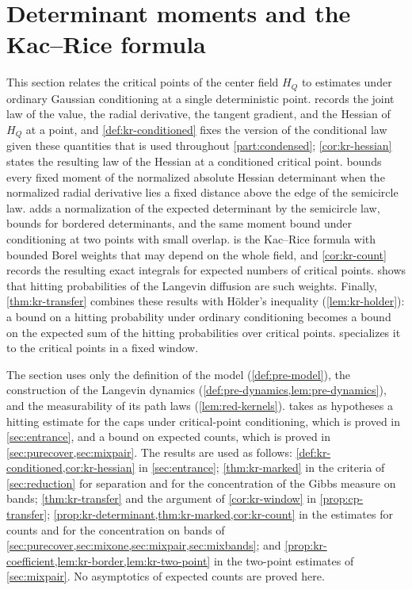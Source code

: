 \chapter{Determinant moments and the Kac--Rice formula}\label{sec:kacrice}

This section relates the critical points of the center field $H_Q$ to estimates under ordinary Gaussian conditioning at a single deterministic point.  records the joint law of the value, the radial derivative, the tangent gradient, and the Hessian of $H_Q$ at a point, and \cref{def:kr-conditioned} fixes the version of the conditional law given these quantities that is used throughout \cref{part:condensed}; \cref{cor:kr-hessian} states the resulting law of the Hessian at a conditioned critical point.  bounds every fixed moment of the normalized absolute Hessian determinant when the normalized radial derivative lies a fixed distance above the edge of the semicircle law.  adds a normalization of the expected determinant by the semicircle law, bounds for bordered determinants, and the same moment bound under conditioning at two points with small overlap.  is the Kac--Rice formula with bounded Borel weights that may depend on the whole field, and \cref{cor:kr-count} records the resulting exact integrals for expected numbers of critical points.  shows that hitting probabilities of the Langevin diffusion are such weights. Finally, \cref{thm:kr-transfer} combines these results with H\"older's inequality (\cref{lem:kr-holder}): a bound on a hitting probability under ordinary conditioning becomes a bound on the expected sum of the hitting probabilities over critical points.  specializes it to the critical points in a fixed window.

The section uses only the definition of the model (\cref{def:pre-model}), the construction of the Langevin dynamics (\cref{def:pre-dynamics,lem:pre-dynamics}), and the measurability of its path laws (\cref{lem:red-kernels}).  takes as hypotheses a hitting estimate for the caps under critical-point conditioning, which is proved in \cref{sec:entrance}, and a bound on expected counts, which is proved in \cref{sec:purecover,sec:mixpair}. The results are used as follows: \cref{def:kr-conditioned,cor:kr-hessian} in \cref{sec:entrance}; \cref{thm:kr-marked} in the criteria of \cref{sec:reduction} for separation and for the concentration of the Gibbs measure on bands; \cref{thm:kr-transfer} and the argument of \cref{cor:kr-window} in \cref{prop:cp-transfer}; \cref{prop:kr-determinant,thm:kr-marked,cor:kr-count} in the estimates for counts and for the concentration on bands of \cref{sec:purecover,sec:mixone,sec:mixpair,sec:mixbands}; and \cref{prop:kr-coefficient,lem:kr-border,lem:kr-two-point} in the two-point estimates of \cref{sec:mixpair}. No asymptotics of expected counts are proved here.

